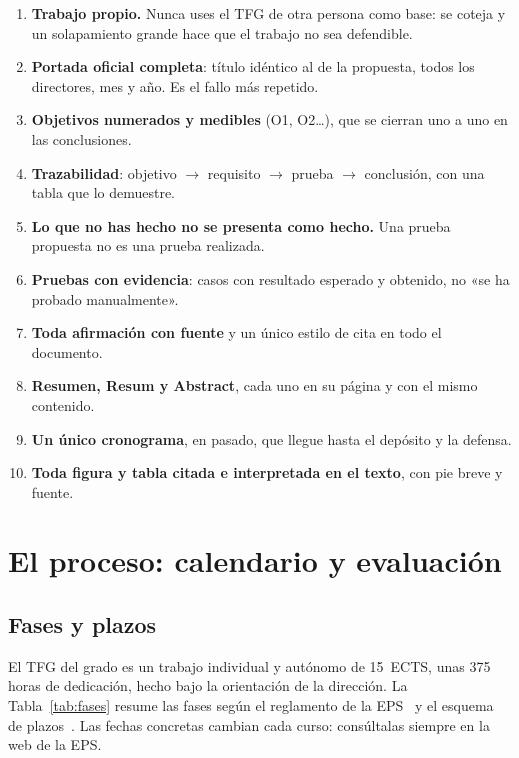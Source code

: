 \documentclass[11pt,a4paper]{article}
\begin{document}
\begin{regla}
\begin{enumerate}[leftmargin=1.5em]
  \item \textbf{Trabajo propio.} Nunca uses el TFG de otra persona como base: se
        coteja y un solapamiento grande hace que el trabajo no sea defendible.
  \item \textbf{Portada oficial completa}: título idéntico al de la propuesta,
        todos los directores, mes y año. Es el fallo más repetido.
  \item \textbf{Objetivos numerados y medibles} (O1, O2\ldots), que se cierran
        uno a uno en las conclusiones.
  \item \textbf{Trazabilidad}: objetivo $\rightarrow$ requisito $\rightarrow$
        prueba $\rightarrow$ conclusión, con una tabla que lo demuestre.
  \item \textbf{Lo que no has hecho no se presenta como hecho.} Una prueba
        propuesta no es una prueba realizada.
  \item \textbf{Pruebas con evidencia}: casos con resultado esperado y obtenido,
        no «se ha probado manualmente».
  \item \textbf{Toda afirmación con fuente} y un único estilo de cita en todo el
        documento.
  \item \textbf{Resumen, Resum y Abstract}, cada uno en su página y con el mismo
        contenido.
  \item \textbf{Un único cronograma}, en pasado, que llegue hasta el depósito y
        la defensa.
  \item \textbf{Toda figura y tabla citada e interpretada en el texto}, con pie
        breve y fuente.
\end{enumerate}
\end{regla}

\section{El proceso: calendario y evaluación}
\label{sec:proceso}

\subsection{Fases y plazos}

El TFG del grado es un trabajo individual y autónomo de 15~ECTS, unas 375 horas
de dedicación, hecho bajo la orientación de la dirección. La
Tabla~\ref{tab:fases} resume las fases según el reglamento de la
EPS~\cite{eps_reglament2024} y el esquema de plazos~\cite{eps_terminis2025}. Las
fechas concretas cambian cada curso: consúltalas siempre en la web de la EPS.
\end{document}
